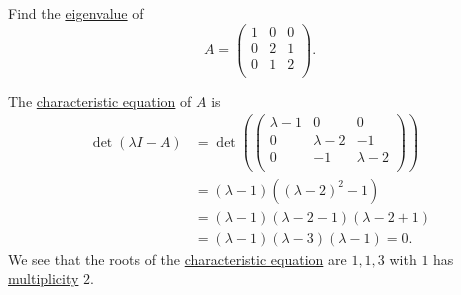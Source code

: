 \begin{eg}
	Find the \hyperref[def:eigenvalue]{eigenvalue} of
	\[
		A = \begin{pmatrix}
			1 & 0 & 0 \\
			0 & 2 & 1 \\
			0 & 1 & 2 \\
		\end{pmatrix}.
	\]
\end{eg}
\begin{explanation}
	The \hyperref[note:characteristic-equation]{characteristic equation} of \(A\) is
	\[
		\begin{split}
			\det(\lambda I - A) &= \det \left(  \begin{pmatrix}
				\lambda - 1 & 0            & 0             \\
				0           & \lambda -  2 & -1            \\
				0           & -1           & \lambda -   2 \\
			\end{pmatrix}\right)\\
			&= (\lambda - 1)((\lambda - 2 )^2 - 1)\\
			&= (\lambda - 1)(\lambda - 2 - 1)(\lambda - 2 + 1)\\
			&= (\lambda - 1)(\lambda - 3)(\lambda - 1) = 0.
		\end{split}
	\]
	We see that the roots of the \hyperref[note:characteristic-equation]{characteristic equation} are \(1, 1, 3\) with \(1\) has \hyperref[def:multiplicity]{multiplicity} \(2\).
\end{explanation}

